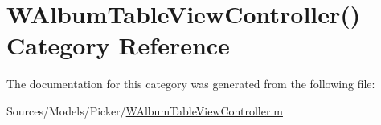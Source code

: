 \hypertarget{category_w_album_table_view_controller_07_08}{\section{W\-Album\-Table\-View\-Controller() Category Reference}
\label{category_w_album_table_view_controller_07_08}
}


The documentation for this category was generated from the following file\-:\begin{DoxyCompactItemize}
\item 
Sources/\-Models/\-Picker/\hyperlink{_w_album_table_view_controller_8m}{W\-Album\-Table\-View\-Controller.\-m}\end{DoxyCompactItemize}
